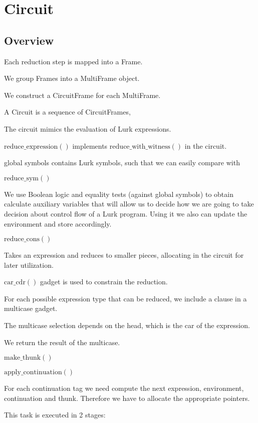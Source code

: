 \documentclass[10pt, english]{article}
\newcommand{\redexp}{\mathrm{reduce\_expression}}
\newcommand{\redwithwit}{\mathrm{reduce\_with\_witness}}
\newcommand{\redcons}{\mathrm{reduce\_cons}}
\newcommand{\redsym}{\mathrm{reduce\_sym}}
\newcommand{\applycont}{\mathrm{apply\_continuation}}
\newcommand{\carcdr}{\mathrm{car\_cdr}}
\newcommand{\makethunk}{\mathrm{make\_thunk}}
\begin{document}
\section{Circuit}

\subsection{Overview}

Each reduction step is mapped into a Frame.

We group Frames into a MultiFrame object.

We construct a CircuitFrame for each MultiFrame.

A Circuit is a sequence of CircuitFrames,

The circuit mimics the evaluation of Lurk expressions.

$\redexp()$ implements $\redwithwit()$ in the circuit.

global symbols contains Lurk symbols, such that we can easily compare with


$\redsym()$

 We use Boolean logic and equality tests (against global symbols) to obtain calculate auxiliary variables that will allow us to decide how we are going to take decision about control flow of a Lurk program. Using it we also can update the environment and store accordingly.

$\redcons()$

Takes an expression and reduces to smaller pieces, allocating in the circuit for later utilization.

$\carcdr()$ gadget is used to constrain the reduction.

For each possible expression type that can be reduced, we include a clause in a multicase gadget.

The multicase selection depends on the head, which is the car of the expression.

We return the result of the multicase.


$\makethunk()$

$\applycont()$

For each continuation tag we need compute the next expression, environment, continuation and thunk. Therefore we have to allocate the appropriate pointers.

This task is executed in 2 stages:
\end{document}
